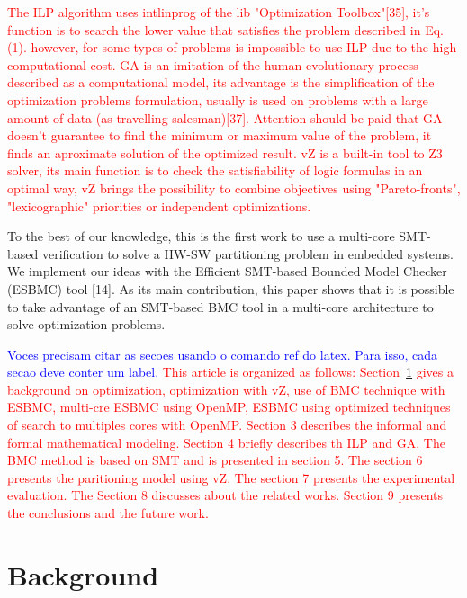 \textcolor{Red}{The ILP algorithm uses intlinprog of the lib "Optimization Toolbox"[35], it's function is to search the lower value that satisfies the problem described in Eq.(1). however, for some types of problems is impossible to use ILP due to the high computational cost. GA is an imitation of the human evolutionary process described as a computational model, its advantage is the simplification of the optimization problems formulation, usually is used on problems with a large amount of data (as travelling salesman)[37]. Attention should be paid that GA doesn't guarantee to find the minimum or maximum value of the problem, it finds an aproximate solution of the optimized result. vZ is a built-in tool to Z3 solver, its main function is to check the satisfiability of logic formulas in an optimal way, vZ  brings the possibility to combine objectives using "Pareto-fronts", "lexicographic" priorities or independent optimizations.}


To the best of our knowledge, this is the first work to use a multi-core SMT-based verification to solve a HW-SW partitioning problem in embedded systems. We implement our ideas with the Efficient SMT-based Bounded Model Checker (ESBMC) tool [14]. As its main contribution, this paper shows that it is possible to take advantage of an SMT-based BMC tool in a multi-core architecture to solve optimization problems.

\textcolor{blue}{Voces precisam citar as secoes usando o comando ref do latex. Para isso, cada secao deve conter um label.}
\textcolor{Red}{This article is organized as follows: Section~\ref{background} gives a background on optimization, optimization with vZ, use of BMC technique with ESBMC, multi-cre ESBMC using OpenMP, ESBMC using optimized techniques of search to multiples cores with OpenMP. Section 3 describes the informal and formal mathematical modeling. Section 4 briefly describes th ILP and GA. The BMC method is based on SMT and is presented in section 5. The section 6 presents the paritioning model using vZ. The section 7 presents the experimental evaluation. The Section 8 discusses about the related works. Section 9 presents the conclusions and the future work.}

\section{Background}
\label{background}

